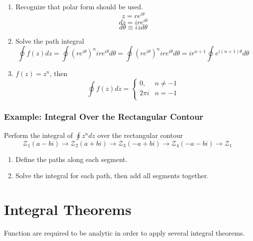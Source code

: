 \documentclass[12pt]{article}
\begin{document}
\begin{enumerate}
	\item Recognize that polar form should be used.
		\begin{equation*}
		    z=re^{i\theta}
		\end{equation*}
		\begin{equation*}
			dz=ire^{i\theta}
		\end{equation*}	
		\begin{equation*}
		    	d\theta \equiv izd\theta
		\end{equation*}
	
	\item Solve the path integral
		\begin{equation*}
			\oint f(z)dz = \oint (re^{i\theta})^n ire^{i\theta} d\theta = \oint (re^{i\theta})^n ire^{i\theta}d\theta = ir^{n+1}\oint e^{i(n+1)\theta}d\theta
		\end{equation*}	

	\item $f(z) = z^{n}$, then 
		    \[ \oint f(z)dz = \begin{cases} 
          0, & n \neq -1 \\
          2\pi i & n = -1 \\
       \end{cases}
    \]
\end{enumerate}

\subsubsection{Example: Integral Over the Rectangular Contour}
Perform the integral of $\oint z^{n}dz$ over the rectangular contour
\begin{equation*}
\mathcal{Z}_1(a-bi) \rightarrow \mathcal{Z}_2(a+bi) \rightarrow \mathcal{Z}_3(-a+bi) \rightarrow \mathcal{Z}_4(-a-bi) \rightarrow \mathcal{Z}_1
\end{equation*}

\begin{enumerate}
	\item Define the paths along each segment. 
	\item Solve the integral for each path, then add all segments together.
\end{enumerate}

\section{Integral Theorems}
Function are required to be analytic in order to apply several integral theorems.
\end{document}
